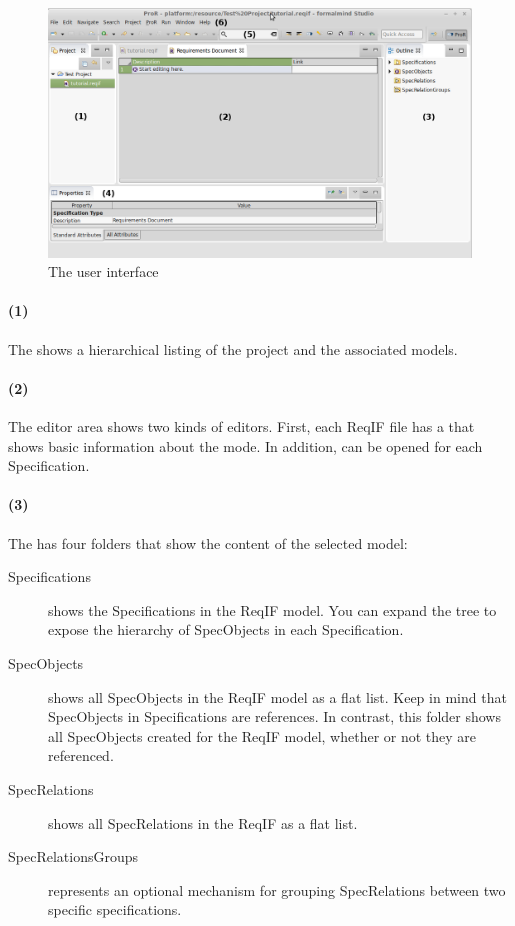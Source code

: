 \begin{figure}
  \centering
  \includegraphics[width=\linewidth]{../rmf-images/Screenshot_intro.png}
  \caption{The \pror{} user interface}
  \label{fig:user_interface_overview}
\end{figure}

\paragraph{(1)} The  shows a hierarchical listing of the project and the associated models.

\paragraph{(2)} The editor area shows two kinds of editors.  First, each ReqIF file has a  that shows basic information about the mode.  In addition,  can be opened for each Specification.

\paragraph{(3)} The  has four folders that show the content of the selected model:

\begin{description}

\item[Specifications] shows the Specifications in the ReqIF model.  You can
  expand the tree to expose the hierarchy of SpecObjects in each Specification.
\item[SpecObjects] shows all SpecObjects in the ReqIF model as a flat list.
  Keep in mind that SpecObjects in Specifications are references.  In
  contrast, this folder shows all SpecObjects created for the ReqIF model, whether or not they are referenced.
\item[SpecRelations] shows all SpecRelations in the ReqIF as a flat list.
\item[SpecRelationsGroups] represents an optional mechanism for grouping SpecRelations between two specific specifications.
\end{description}

